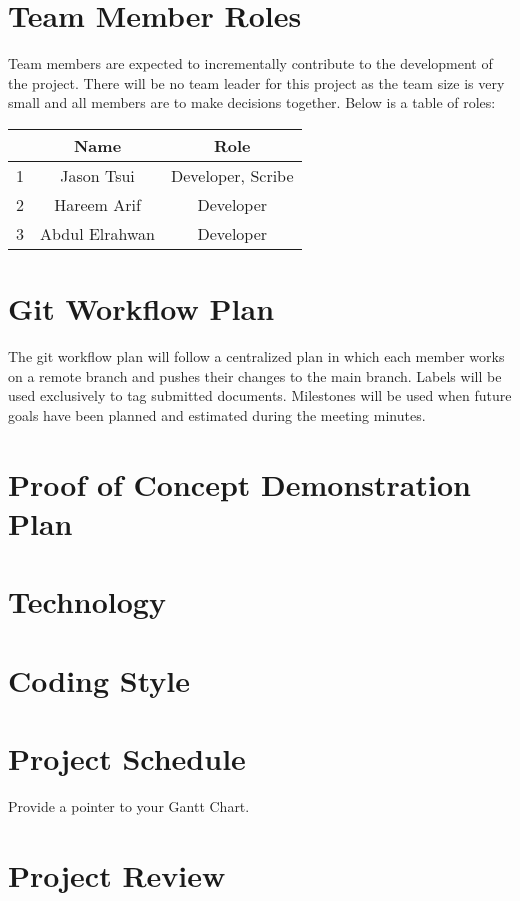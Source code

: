 \documentclass[12pt]{article}
\begin{document}
\section{Team Member Roles}

\tab Team members are expected to incrementally contribute to the development of the project. There will be no team leader for this project as the team size is very small and all members are to make decisions together. Below is a table of roles:

\begin{center}
  \begin{tabular}{|c|c|c|}
  \hline
  &Name & Role \\ \hline
  1& Jason Tsui & Developer, Scribe\\ 
  2& Hareem Arif & Developer\\ 
  3&Abdul Elrahwan & Developer\\ \hline
\end{tabular}
\end{center}

\section{Git Workflow Plan}

\tab The git workflow plan will follow a centralized plan in which each member works on a remote branch and pushes their changes to the main branch. Labels will be used exclusively to tag submitted documents. Milestones will be used when future goals have been planned and estimated during the meeting minutes. 

\section{Proof of Concept Demonstration Plan}

\section{Technology}

\section{Coding Style}

\section{Project Schedule}

Provide a pointer to your Gantt Chart.

\section{Project Review}
\end{document}
